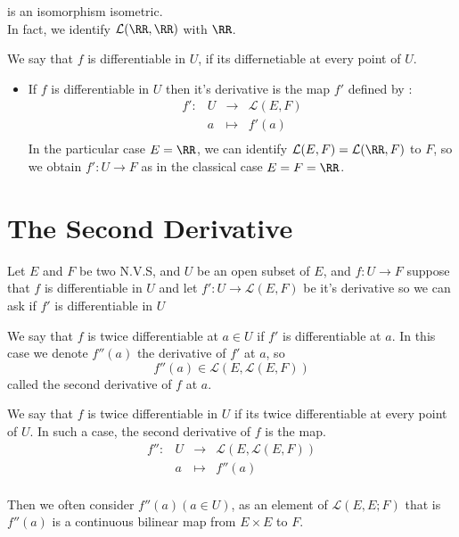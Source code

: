 is an isomorphism isometric. \\
In fact, we identify $\mathcal{L} (\RR ,\RR )  $ 
with $\RR  $.
\begin{definition}[]
We say that $f $ is differentiable in $U $, if its differnetiable
at every point of $U $. 
\begin{itemize}
\item If $f $ is differentiable in $U $ then it's
	derivative is the map $f' $ defined by : 
	\[
	\begin{array}{cccc}
	      f' : &  U  & \longrightarrow & 
	      \mathcal{L} (E,F) \\
	           &  a  & \longmapsto     & f'(a)  \\ 
	\end{array}
	\]
	In the particular case $E = \RR  $, 
	we can identify $\mathcal{L} (E,F) = 
	\mathcal{L} (\RR ,F)$ to $F $, so we obtain
	$ f' : U \longrightarrow F $ as in the classical
	case $E = F = \RR  $.
\end{itemize}
\end{definition}
\section{The Second Derivative}
Let $E $ and $F $ be two N.V.S, and $U $ be an open
subset of $E $, and $ f : U \longrightarrow F $ suppose that 
$f $ is differentiable in $U $ and let 
$ f' : U \longrightarrow \mathcal{L} (E,F)  $ be it's 
derivative so we can ask if $f' $ is differentiable in $U$ 
\begin{definition}[]
We say that $f $ is twice differentiable 
at $a  \in U$ if $f'  $ is differentiable at $a $. In this
case we denote $f''(a)   $ the derivative of $f' $  at
$a $, so 
\[
f''(a) \in  
\mathcal{L} (E, \mathcal{L} (E,F) ) 
\]
called the second derivative of $f $ at $a$. 
\end{definition}
\begin{definition}[]
We say that $f $ is twice differentiable in $U $ if 
its twice differentiable at every point 
of $U$. In such a case, the second derivative of $f$ is the 
map.
\[
\begin{array}{cccc}
      f'' : &  U  & \longrightarrow & 
      \mathcal{L} (E, 
      \mathcal{L} (E,F) ) \\
           &   a & \longmapsto     & f''(a)  \\
\end{array}
\]
\end{definition}
Then we often consider $f''( a) (a \in U)   $, as
an element of $\mathcal{L} (E,E;F)  $ that is 
$f''(a)  $ is a continuous bilinear map from 
$E \times E$ to $F$.
% 

